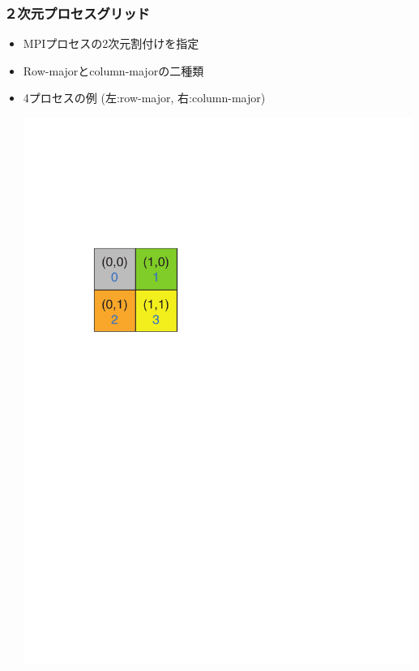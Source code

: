 \begin{frame}
  \frametitle{２次元プロセスグリッド}
  \begin{itemize}
  \item MPIプロセスの2次元割付けを指定
  \item Row-majorとcolumn-majorの二種類
  \item 4プロセスの例 (左:row-major, 右:column-major)
  \begin{center}
    \includegraphics[height=0.25\textheight]{figure/grid-row-major.pdf} \ \ \ \

\end{center}
\end{itemize}
\end{frame}
